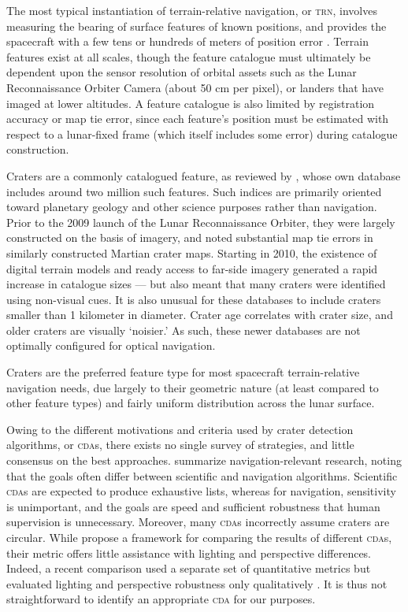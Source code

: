 \documentclass[12pt]{article}
\begin{document}
The most typical instantiation of terrain-relative navigation, or \textsc{trn}, involves measuring the bearing of surface features of known positions, and provides the spacecraft with a few tens or hundreds of meters of position error \citep{Christensen2011}. Terrain features exist at all scales, though the feature catalogue must ultimately be dependent upon the sensor resolution of orbital assets such as the Lunar Reconnaissance Orbiter Camera (about 50 cm per pixel), or landers that have imaged at lower altitudes. A feature catalogue is also limited by registration accuracy or map tie error, since each feature's position must be estimated with respect to a lunar-fixed frame (which itself includes some error) during catalogue construction.

Craters are a commonly catalogued feature, as reviewed by \citet{Robbins2019}, whose own database includes around two million such features. Such indices are primarily oriented toward planetary geology and other science purposes rather than navigation. Prior to the 2009 launch of the Lunar Reconnaissance Orbiter, they were largely constructed on the basis of imagery, and \citet{Salamuniccar2008} noted substantial map tie errors in similarly constructed Martian crater maps. Starting in 2010, the existence of digital terrain models and ready access to far-side imagery generated a rapid increase in catalogue sizes --- but also meant that many craters were identified using non-visual cues. It is also unusual for these databases to include craters smaller than 1 kilometer in diameter. Crater age correlates with crater size, and older craters are visually `noisier.' As such, these newer databases are not optimally configured for optical navigation.

Craters are the preferred feature type for most spacecraft terrain-relative navigation needs, due largely to their geometric nature (at least compared to other feature types) and fairly uniform distribution across the lunar surface.

Owing to the different motivations and criteria used by crater detection algorithms, or \textsc{cda}s, there exists no single survey of strategies, and little consensus on the best approaches. \citet{Christian2020} summarize navigation-relevant research, noting that the goals often differ between scientific and navigation algorithms. Scientific \textsc{cda}s are expected to produce exhaustive lists, whereas for navigation, sensitivity is unimportant, and the goals are speed and sufficient robustness that human supervision is unnecessary. Moreover, many \textsc{cda}s incorrectly assume craters are circular. While \citet{Salamuniccar2008} propose a framework for comparing the results of different \textsc{cda}s, their metric offers little assistance with lighting and perspective differences. Indeed, a recent comparison used a separate set of quantitative metrics but evaluated lighting and perspective robustness only qualitatively \citep{Woicke2018}. It is thus not straightforward to identify an appropriate \textsc{cda} for our purposes.
\end{document}
